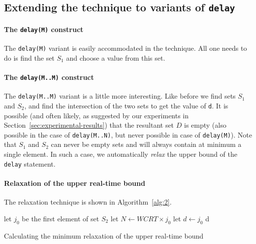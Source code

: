 \subsection{Extending the technique to variants of \texttt{delay}}
\label{sec:extend-tehcn-vari}

\paragraph{The \texttt{delay(M)} construct}
\label{sec:extend-techn-vari}

The \texttt{delay(M)} variant is easily accommodated in the
technique. All one needs to do is find the set $S_1$ and choose a value
from this set.

\paragraph{The \texttt{delay(M..M)} construct}
\label{sec:extend-techn-vari}

The \texttt{delay(M..M)} variant is a little more interesting. Like
before we find sets $S_1$ and $S_2$, and find the intersection of the
two sets to get the value of \texttt{d}. It is possible (and often
likely, as suggested by our experiments in
Section~\ref{sec:experimental-results}) that the resultant set $D$ is
empty (also possible in the case of \texttt{delay(M..N)}, but never
possible in case of \texttt{delay(M)}). Note that $S_1$ and $S_2$ can
never be empty sets and will always contain at minimum a single
element. In such a case, we automatically \textit{relax} the upper bound
of the \texttt{delay} statement.

\paragraph{Relaxation of the upper real-time bound}
\label{sec:over-appr-relax}

The relaxation technique is shown in Algorithm~\ref{alg:2}.
  
\begin{algorithm}[t!]
  \begin{minipage}{1.0\linewidth}
    \SetAlgoLined
     {
      let $j_{0}$ be the first element of set $S_2$\;
      \ShowLn let $N \leftarrow WCRT \times j_0$\;
      let $d \leftarrow j_0$\;
    }
    \Return d\;
    \caption{Calculating the minimum relaxation of the upper real-time
      bound}
    \label{alg:2}
  \end{minipage}
\end{algorithm}


